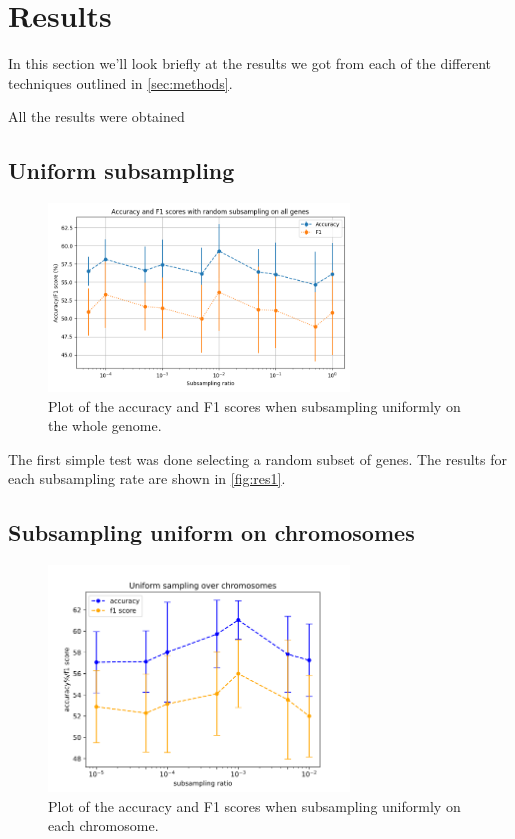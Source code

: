 \section{Results}
\label{sec:results}
In this section we'll look briefly at the results we got from each of the different techniques outlined in \autoref{sec:methods}.

All the results were obtained 

\subsection{Uniform subsampling}
\begin{figure}[ht]
    \begin{center}
\includegraphics[width=8cm]{figures/subsample_plot.png}
    \end{center}
\caption{Plot of the accuracy and F1 scores when subsampling uniformly on the whole genome.}
\label{fig:res1}
\end{figure}

The first simple test was done selecting a random subset of genes. The results for each subsampling rate are shown in \autoref{fig:res1}.




\subsection{Subsampling uniform on chromosomes}
\begin{figure}[ht]
    \begin{center}
\includegraphics[width=8cm]{figures/uniform_sample_low_ratio.png}
% 
    \end{center}
\caption{Plot of the accuracy and F1 scores when subsampling uniformly on each chromosome.}
\label{fig:res2}
\end{figure}

